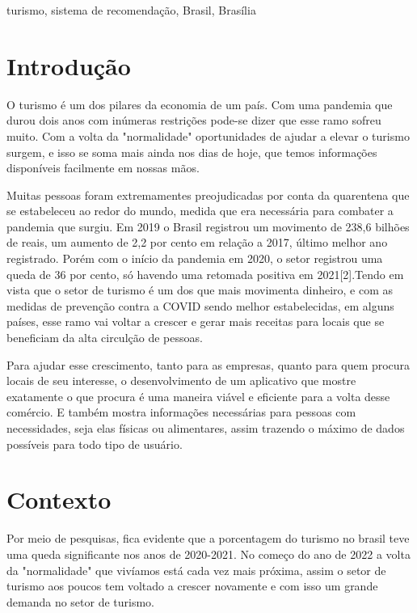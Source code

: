 \documentclass[conference]{IEEEtran}
\begin{document}
\begin{IEEEkeywords}
turismo, sistema de recomendação, Brasil, Brasília
\end{IEEEkeywords}

\section{Introdução}
O turismo é um dos pilares da economia de um país. Com uma pandemia que durou dois anos com inúmeras restrições pode-se dizer que esse ramo sofreu muito. Com a volta da "normalidade" oportunidades de ajudar a elevar o turismo surgem, e isso se soma mais ainda nos dias de hoje, que temos informações disponíveis facilmente em nossas mãos.

Muitas pessoas foram extremamentes preojudicadas por conta da quarentena que se estabeleceu ao redor do mundo, medida que era necessária para  combater a pandemia que surgiu. Em 2019 o Brasil registrou um movimento de 238,6 bilhões de reais, um aumento de 2,2 por cento em relação a 2017, último melhor ano registrado\cite{b1}. Porém com o início da pandemia em 2020, o setor registrou uma queda de 36 por cento, só havendo uma retomada positiva em 2021[2].Tendo em vista que o setor de turismo é um dos que mais movimenta dinheiro, e com as medidas de prevenção contra a COVID sendo melhor estabelecidas, em alguns países, esse ramo vai voltar a crescer e gerar mais receitas para locais que se beneficiam da alta circulção de pessoas.

Para ajudar esse crescimento, tanto para as empresas, quanto para quem procura locais de seu interesse, o desenvolvimento de um aplicativo que mostre exatamente o que procura é uma maneira viável e eficiente para a volta desse comércio. E também mostra informações necessárias para pessoas com necessidades, seja elas físicas ou alimentares, assim trazendo o máximo de dados possíveis para todo tipo de usuário\cite{b3}.



\section{Contexto}
Por meio de pesquisas, fica evidente que a porcentagem do turismo no brasil teve uma queda significante nos anos de 2020-2021. No começo do ano de 2022 a volta da "normalidade" que vivíamos está cada vez mais próxima, assim o setor de turismo aos poucos tem voltado a crescer novamente e com isso um grande demanda no setor de turismo.
\end{document}
